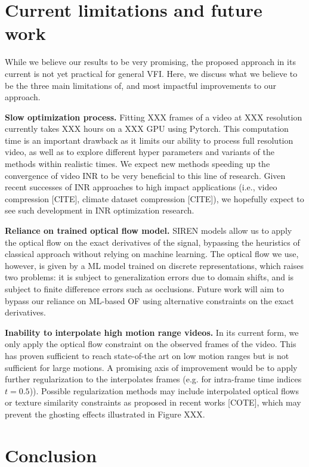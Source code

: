 \documentclass{article}
\begin{document}
\section{Current limitations and future work}

While we believe our results to be very promising, the proposed approach in its current is not yet practical for general VFI.
Here, we discuss what we believe to be the three main limitations of, and most impactful improvements to our approach.

\textbf{Slow optimization process.} Fitting XXX frames of a video at XXX resolution currently takes XXX hours on a XXX GPU using Pytorch.
This computation time is an important drawback as it limits our ability to process full resolution video,
 as well as to explore different hyper parameters and variants of the methods within realistic times.
We expect new methods speeding up the convergence of video INR to be very beneficial to this line of research.
Given recent successes of INR approaches to high impact applications (i.e., video compression [CITE], climate dataset compression [CITE]),
we hopefully expect to see such development in INR optimization research.

\textbf{Reliance on trained optical flow model.}
SIREN models allow us to apply the optical flow on the exact derivatives of the signal,
bypassing the heuristics of classical approach without relying on machine learning.
The optical flow we use, however, is given by a ML model trained on discrete representations, which raises two problems:
it is subject to generalization errors due to domain shifts,
and is subject to finite difference errors such as occlusions.
Future work will aim to bypass our reliance on ML-based OF using alternative constraints on the exact derivatives.

\textbf{Inability to interpolate high motion range videos.}
In its current form, we only apply the optical flow constraint on the observed frames of the video.
This has proven sufficient to reach state-of-the art on low motion ranges but is not sufficient for large motions.
A promising axis of improvement would be to apply further regularization to the interpolates frames (e.g. for intra-frame time indices $t=0.5$)).
Possible regularization methods may include interpolated optical flows or texture similarity constraints as proposed in recent works [COTE],
which may prevent the ghosting effects illustrated in Figure XXX.

\section{Conclusion}
\end{document}
